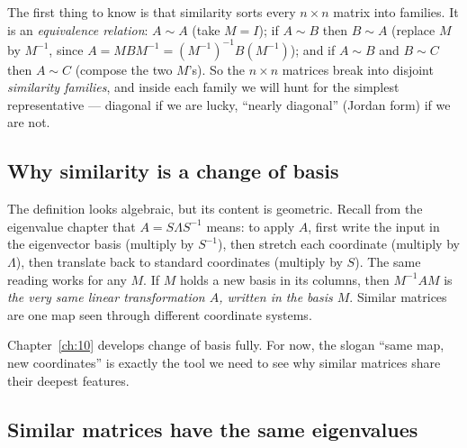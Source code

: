 
The first thing to know is that similarity sorts every $n\times n$ matrix into families. It is an \emph{equivalence relation}: $A\sim A$ (take $M=I$); if $A\sim B$ then $B\sim A$ (replace $M$ by $M^{-1}$, since $A=MBM^{-1}=(M^{-1})^{-1}B(M^{-1})$); and if $A\sim B$ and $B\sim C$ then $A\sim C$ (compose the two $M$'s). So the $n\times n$ matrices break into disjoint \emph{similarity families}, and inside each family we will hunt for the simplest representative --- diagonal if we are lucky, ``nearly diagonal'' (Jordan form) if we are not.

\subsection{Why similarity is a change of basis}

The definition looks algebraic, but its content is geometric. Recall from the eigenvalue chapter that $A=S\Lambda S^{-1}$ means: to apply $A$, first write the input in the eigenvector basis (multiply by $S^{-1}$), then stretch each coordinate (multiply by $\Lambda$), then translate back to standard coordinates (multiply by $S$). The same reading works for any $M$. If $M$ holds a new basis in its columns, then $M^{-1}AM$ is \emph{the very same linear transformation $A$, written in the basis $M$}. Similar matrices are one map seen through different coordinate systems.


Chapter~\ref{ch:10} develops change of basis fully. For now, the slogan ``same map, new coordinates'' is exactly the tool we need to see why similar matrices share their deepest features.

\subsection{Similar matrices have the same eigenvalues}


